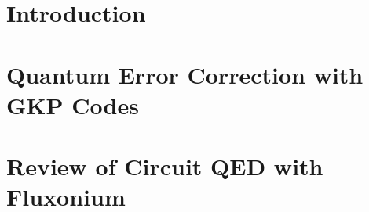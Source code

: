 \documentclass[12pt]{mitthesis}
\begin{document}

% 

% 

\sffamily  
{}
\tableofcontents
\clearpage

\rmfamily

\chapter{Introduction\label{ch:1_Introduction}}
% 
\clearpage

\chapter{Quantum Error Correction with GKP Codes\label{ch:2_QEC}}
% 
\clearpage

\chapter{Review of Circuit QED with Fluxonium\label{ch:3_cQED}}
% 
\clearpage
\end{document}
